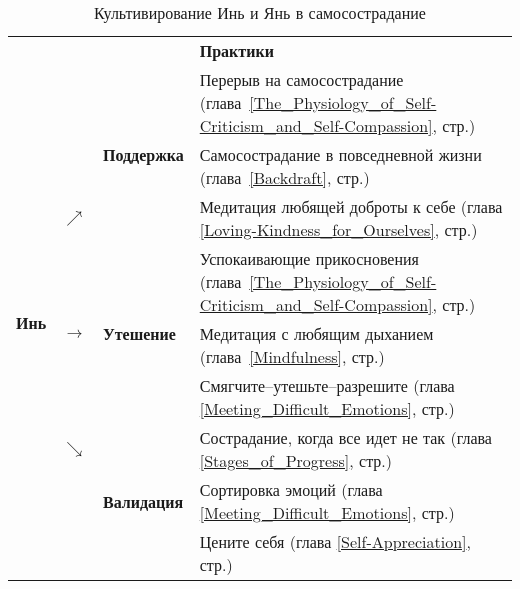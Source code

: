 \begin{table}[!h]
	\begin{center}
		\caption{Культивирование Инь и Янь в самосострадание}\label{tab:Yin_and_Yang}
		\setlength{\extrarowheight}{1mm}
		\begin{tabular}{p{1.2cm}p{3mm}p{2.6cm}||p{9.9cm}}
			\multicolumn{3}{r}{ } & {\large \textbf{Практики}}\\[1mm]
			\cline{3-4}
			\multirow{9}{*}{{\LARGE\textbf{Инь}}} &  & \multirow{3}{*}{\textbf{Поддержка}} & {\small Перерыв на самосострадание (глава~\ref{The_Physiology_of_Self-Criticism_and_Self-Compassion}, стр.\:\pageref{IP:Self-Compassion_Break})}\\ 
			&  &  & {\small Самосострадание в повседневной жизни (глава~\ref{Backdraft}, стр.\:\pageref{IP:Self-Compassion_in_Daily_Life})}\\ 
			& $\nearrow$ &  &{\small  Медитация любящей доброты к себе (глава \ref{Loving-Kindness_for_Ourselves}, стр.\:\pageref{M:Loving-Kindness_for_Ourselves})}\\ \cline{3-4}
			& \multirow{3}{*}{\textbf{$\rightarrow$}} & \multirow{3}{*}{\textbf{Утешение}} & {\small Успокаивающие прикосновения (глава~\ref{The_Physiology_of_Self-Criticism_and_Self-Compassion}, стр.\:\pageref{IP:Soothing_Touch})}\\
			&   &   & {\small Медитация с любящим дыханием (глава~\ref{Mindfulness}, стр.\:\pageref{medit:Affectionate_Breathing})}\\
			&   &   & {\small Смягчите--утешьте--разрешите (глава \ref{Meeting_Difficult_Emotions}, стр.\:\pageref{IP:Soften_Soothe_Allow})}\\ \cline{3-4}
			& $\searrow$ & \multirow{3}{*}{\textbf{Валидация}} &{\small  Сострадание, когда все идет не так (глава \ref{Stages_of_Progress}, стр.\:\pageref{Being_a_Compassionate_Mess})}\\
			&   &   & {\small Сортировка эмоций (глава \ref{Meeting_Difficult_Emotions}, стр.\:\pageref{IP:Working_with_Difficult_Emotions})}\\
			&   &   & {\small Цените себя (глава \ref{Self-Appreciation}, стр.\:\pageref{Ex:Self-Appreciation})}\\ \cline{3-4}
		\end{tabular}
		\setlength{\extrarowheight}{0mm}
	\end{center}
\end{table} 
